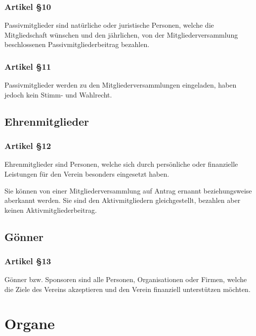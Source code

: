 \documentclass[a4paper,10pt,fleqn]{article}
\begin{document}

\subsubsection*{Artikel §10}
Passivmitglieder sind natürliche oder juristische Personen, 
welche die Mitgliedschaft wünschen und den jährlichen, von
der Mitgliederversammlung beschlossenen
Passivmitgliederbeitrag bezahlen.

\subsubsection*{Artikel §11}
Passivmitglieder werden zu den Mitgliederversammlungen 
eingeladen, haben jedoch kein Stimm- und Wahlrecht.

\subsection{Ehrenmitglieder}

\subsubsection*{Artikel §12}
Ehrenmitglieder sind Personen, welche sich durch persönliche
oder finanzielle Leistungen für den Verein besonders
eingesetzt haben.

Sie können von einer Mitgliederversammlung auf Antrag 
ernannt beziehungsweise aberkannt werden. Sie sind den
Aktivmitgliedern gleichgestellt, bezahlen aber keinen
Aktivmitgliederbeitrag.

\subsection{Gönner}

\subsubsection*{Artikel §13}
Gönner bzw. Sponsoren sind alle Personen, Organisationen 
oder Firmen, welche die Ziele des Vereins akzeptieren und
den Verein finanziell unterstützen möchten.

\section{Organe}
\end{document}
